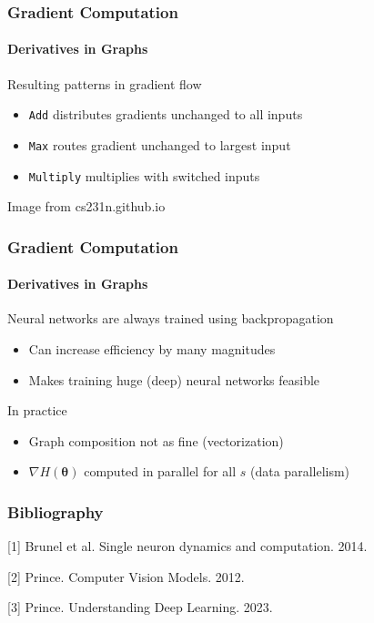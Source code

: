 \documentclass[xetex,professionalfont]{beamer}
\let\oldemph\emph
\renewcommand\emph[1]{\textcolor{tuwcvl_cvl_blue}{#1}}
\newcommand{\bth}{\boldsymbol{\theta}}
\begin{document}
\begin{frame}
\frametitle{Gradient Computation}
\framesubtitle{Derivatives in Graphs}

Resulting patterns in gradient flow
\begin{itemize}
    \item \texttt{Add} distributes gradients unchanged to all inputs %
    \item \texttt{Max} routes gradient unchanged to largest input %
    \item \texttt{Multiply} multiplies with switched inputs
\end{itemize}

\medskip

\begin{center}
    {\centering Image from cs231n.github.io}
\end{center}

\end{frame}


\begin{frame}
\frametitle{Gradient Computation}
\framesubtitle{Derivatives in Graphs}

Neural networks are always trained using backpropagation
\begin{itemize}
    \item Can increase efficiency by many magnitudes %
    \item Makes training huge (deep) neural networks feasible
\end{itemize}

\bigskip

In practice
\begin{itemize}
    \item Graph composition not as fine (vectorization) %
    \item $\nabla H(\bth)$ computed in parallel for all $s$ (data parallelism)
\end{itemize}

\end{frame}


\renewcommand\emph[1]{\oldemph{#1}}

\begin{frame}
\frametitle{Bibliography}

[1] Brunel et al. Single neuron dynamics and computation. 2014.

\smallskip

[2] Prince. Computer Vision Models. 2012.

\smallskip

[3] Prince. Understanding Deep Learning. 2023.

\end{frame}
\end{document}
